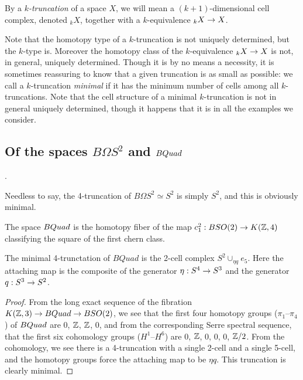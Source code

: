 \documentclass{amsart}
\begin{document}
\begin{definition}[Truncation]
By a \emph{$k$-truncation} of a space $X$, we will mean a $(k+1)$-dimensional cell complex, denoted $_k X$, together with a $k$-equivalence $_{k} X \rightarrow X$.
\end{definition}
\nid Note that the homotopy type of a $k$-truncation is not uniquely determined, but the $k$-type is.  Moreover the homotopy class of the $k$-equivalence $_k X \rightarrow X$ is not, in general, uniquely determined.  Though it is by no means a necessity, it is sometimes reassuring to know that a given truncation is as small as possible: we call a $k$-truncation \emph{minimal} if it has the minimum number of cells among all $k$-truncations.  Note that the cell structure of a minimal $k$-truncation is not in general uniquely determined, though it happens that it is in all the examples we consider.


\subsection{Of the spaces $B\Omega S^2$ and $BQuad$}.

Needless to say, the 4-truncation of $B\Omega S^2 \simeq S^2$ is simply $S^2$, and this is obviously minimal.

\begin{definition}[$BQuad$]
The space $BQuad$ is the homotopy fiber of the map $c_1^2: BSO(2) \rightarrow K(\mathbb Z,4)$ classifying the square of the first chern class.
\end{definition}


\begin{proposition} 
\label{prop-quadtrunc}
The minimal 4-trunctation of $BQuad$ is the 2-cell complex $S^2 \cup_{\eta q} e_5$.  Here the attaching map is the composite of the generator $\eta: S^4 \rightarrow S^3$ and the generator $q: S^3 \rightarrow S^2$.
\end{proposition}

\begin{proof}
From the long exact sequence of the fibration $K(\mathbb Z,3) \rightarrow BQuad \rightarrow BSO(2)$, we see that the first four homotopy groups ($\pi_1$--$\pi_4$) of $BQuad$ are $0$, $\mathbb Z$, $\mathbb Z$, $0$, and from the corresponding Serre spectral sequence, that the first six cohomology groups ($H^1$--$H^6$) are $0$, $\mathbb Z$, $0$, $0$, $0$, $\mathbb Z/2$.  From the cohomology, we see there is a 4-truncation with a single 2-cell and a single 5-cell, and the homotopy groups force the attaching map to be $\eta q$.  This truncation is clearly minimal.
\end{proof}
\end{document}
